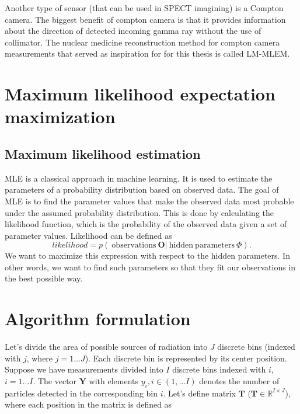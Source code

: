 {  Another type of sensor (that can be used in \ac{SPECT} imagining) is a Compton camera.
  The biggest benefit of compton camera is that it provides information about the direction of detected incoming gamma ray without the use of collimator.
  The nuclear medicine reconstruction method for compton camera measurements that served as inspiration for for this thesis is called \ac{LM-MLEM}.

  \section{Maximum likelihood expectation maximization}



  \cite{1982_shepp_vardi_MLEM} \cite{EM} \cite{wilderman}

  \subsection{Maximum likelihood estimation}
  \ac{MLE} is a classical approach in machine learning.
  It is used to estimate the parameters of a probability distribution based on observed data. 
  The goal of \ac{MLE} is to find the parameter values that make the observed data most probable under the assumed probability distribution.
  This is done by calculating the likelihood function, which is the probability of the observed data given a set of parameter values.
  Likelihood can be defined as 
  \begin{equation}
    likelihood = p(\ \mathrm{observations } \  \boldsymbol{O} | \ \mathrm{hidden \ parameters\ } \Phi ).
    \label{eq:likelihood}
  \end{equation}
  We want to maximize this expression with respect to the hidden parameters.
  In other words, we want to find such parameters so that they fit our observations in the best possible way.

  \section{Algorithm formulation}
  Let's divide the area of possible sources of radiation into $J$ discrete bins (indexed with $j$, where $j = 1 \dotsc J$).
  Each discrete bin is represented by its center position.
  Suppose we have measurements divided into $I$ discrete bins indexed with $i$, $i = 1 \dotsc I$.
  The vector $\mathbf{Y}$ with elements $y_{i}, i \in (1, \dots I)$ denotes the number of particles detected in the corresponding bin $i$.
  Let's define matrix $\mathbf{T}$ ($\mathbf{T} \in \mathbb{R}^{I \times J}$), where each position in the matrix is defined as

}
